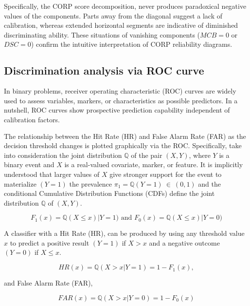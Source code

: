 \documentclass[a4paper,12pt]{article}
\numberwithin{equation}{section}
\begin{document}
      Specifically, the CORP score decomposition, never produces paradoxical negative values of the components. Parts away from the diagonal suggest a lack of calibration, whereas extended horizontal segments are indicative of diminished discriminating ability. These situations of vanishing components ($MCB = 0$ or $DSC = 0$) confirm the intuitive interpretation of CORP reliability diagrams.\bigskip

   \subsection{Discrimination analysis via ROC curve}
   In binary problems, receiver operating characteristic (ROC) curves are widely used to assess variables, markers, or characteristics as possible predictors. In a nutshell, ROC curves show prospective prediction capability independent of calibration factors.\bigskip

   The relationship between the Hit Rate (HR) and False Alarm Rate (FAR) as the decision threshold changes is plotted graphically via the ROC. Specifically, take into consideration the joint distribution $\mathbb{Q}$ of the pair $(X, Y)$, where $Y$ is a binary event and $X$ is a real-valued covariate, marker, or feature. It is implicitly understood that larger values of $X$ give stronger support for the event to materialize $(Y = 1)$ the prevalence $\pi_{1} = \mathbb{Q}(Y=1)\ \in \ (0,1)$ and the conditional Cumulative Distribution Functions (CDFs) define the joint distribution $\mathbb{Q}$ of $(X, Y)$.

   \begin{equation} \label{e:distribution} 
   F_{1}(x) = \mathbb{Q}(X\leq x)|Y=1) \text{ and } F_{0}(x) = \mathbb{Q}(X\leq x)|Y=0)
   \end{equation}

   A classifier with a Hit Rate (HR), can be produced by using any threshold value $x$ to predict a positive result $(Y = 1)$ if $X > x$ and a negative outcome $(Y = 0)$ if $X \leqslant   x$.

   \begin{equation} \label{e:hit_rate} 
   HR(x) = \mathbb{Q}(X>x | Y=1) =1 - F_{1}(x),
   \end{equation}

   and False Alarm Rate (FAR),

   \begin{equation} \label{e:far} 
   FAR(x) = \mathbb{Q}(X>x | Y=0) =1 - F_{0}(x)
   \end{equation}
\end{document}
